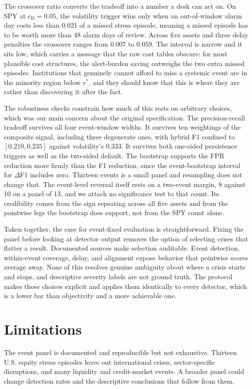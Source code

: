 \documentclass[pdflatex,sn-mathphys-num,iicol]{sn-jnl}
\begin{document}
The crossover ratio converts the tradeoff into a number a desk can act on. On SPY at $c_{\mathrm{D}}=0.05$, the volatility trigger wins only when an out-of-window alarm day costs less than 0.021 of a missed stress episode, meaning a missed episode has to be worth more than 48 alarm days of review. Across five assets and three delay penalties the crossover ranges from 0.007 to 0.059. The interval is narrow and it sits low, which carries a message that the raw cost tables obscure: for most plausible cost structures, the alert-burden saving outweighs the two extra missed episodes. Institutions that genuinely cannot afford to miss a systemic event are in the minority region below $r^{*}$, and they should know that this is where they are rather than discovering it after the fact.

The robustness checks constrain how much of this rests on arbitrary choices, which was our main concern about the original specification. The precision-recall tradeoff survives all four event-window widths. It survives ten weightings of the composite signal, including three degenerate ones, with hybrid F1 confined to $[0.210,0.235]$ against volatility's 0.333. It survives both one-sided persistence triggers as well as the two-sided default. The bootstrap supports the FPR reduction more firmly than the F1 reduction, since the event-bootstrap interval for $\Delta$F1 includes zero. Thirteen events is a small panel and resampling does not change that. The event-level reversal itself rests on a two-event margin, 8 against 10 on a panel of 13, and we attach no significance test to that count. Its credibility comes from the sign repeating across all five assets and from the pointwise legs the bootstrap does support, not from the SPY count alone.

Taken together, the case for event-fixed evaluation is straightforward. Fixing the panel before looking at detector output removes the option of selecting crises that flatter a result. Documented sources make selection auditable. Event detection, within-event coverage, delay, and alignment expose behavior that pointwise scores average away. None of this resolves genuine ambiguity about where a crisis starts and stops, and descriptive severity labels are not ground truth. The protocol makes those choices explicit and applies them identically to every detector, which is a lower bar than objectivity and a more achievable one.

\section{Limitations}
\label{sec:limits}
The event panel is documented and reproducible but not exhaustive. Thirteen U.S. equity stress episodes leave out international crises, sector-specific disruptions, and many liquidity and credit-market events. A broader panel could change detection rates and the descriptive conclusions that follow from them.
\end{document}
